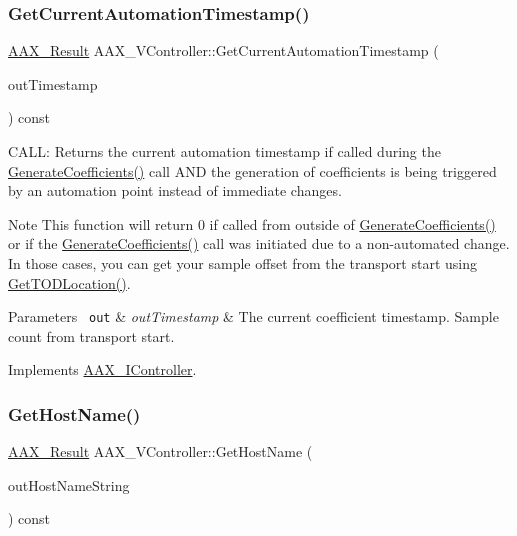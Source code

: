 \subsubsection{\texorpdfstring{GetCurrentAutomationTimestamp()}{GetCurrentAutomationTimestamp()}}
{\footnotesize\ttfamily \mbox{\hyperlink{a00392_a4d8f69a697df7f70c3a8e9b8ee130d2f}{A\+A\+X\+\_\+\+Result}} A\+A\+X\+\_\+\+V\+Controller\+::\+Get\+Current\+Automation\+Timestamp (\begin{DoxyParamCaption}\item[{\mbox{\hyperlink{a00392_ac09cd6857748cc296ac0f8bcc20dc74b}{A\+A\+X\+\_\+\+C\+Transport\+Counter}} $\ast$}]{out\+Timestamp }\end{DoxyParamCaption}) const\hspace{0.3cm}{\ttfamily [virtual]}}



C\+A\+LL\+: Returns the current automation timestamp if called during the \mbox{\hyperlink{a01669_a083265b008921b6114ede387711694b7}{Generate\+Coefficients()}} call A\+ND the generation of coefficients is being triggered by an automation point instead of immediate changes. 

\begin{DoxyNote}{Note}
This function will return 0 if called from outside of \mbox{\hyperlink{a01669_a083265b008921b6114ede387711694b7}{Generate\+Coefficients()}} or if the \mbox{\hyperlink{a01669_a083265b008921b6114ede387711694b7}{Generate\+Coefficients()}} call was initiated due to a non-\/automated change. In those cases, you can get your sample offset from the transport start using \mbox{\hyperlink{a01905_a9ae44bc7589edb872e8194099b575afd}{Get\+T\+O\+D\+Location()}}.
\end{DoxyNote}

\begin{DoxyParams}[1]{Parameters}
\mbox{\texttt{ out}}  & {\em out\+Timestamp} & The current coefficient timestamp. Sample count from transport start. \\
\hline
\end{DoxyParams}


Implements \mbox{\hyperlink{a01789_af9ab9b228023e116f89249a56c27a20f}{A\+A\+X\+\_\+\+I\+Controller}}.

\mbox{\label{a01905_a085af48887bdd2eeb8d498b23ad236f9}} 
\subsubsection{\texorpdfstring{GetHostName()}{GetHostName()}}
{\footnotesize\ttfamily \mbox{\hyperlink{a00392_a4d8f69a697df7f70c3a8e9b8ee130d2f}{A\+A\+X\+\_\+\+Result}} A\+A\+X\+\_\+\+V\+Controller\+::\+Get\+Host\+Name (\begin{DoxyParamCaption}\item[{\mbox{\hyperlink{a01873}{A\+A\+X\+\_\+\+I\+String}} $\ast$}]{out\+Host\+Name\+String }\end{DoxyParamCaption}) const\hspace{0.3cm}{\ttfamily [virtual]}}



